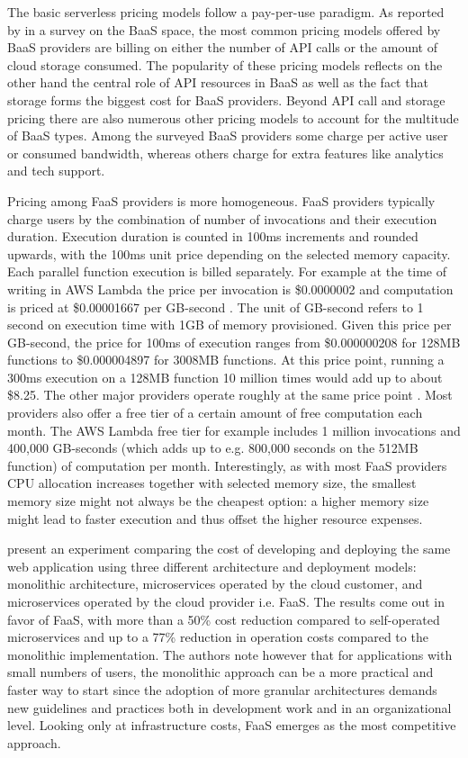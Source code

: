 The basic serverless pricing models follow a pay-per-use paradigm. As reported by \textcite{lane13baas} in a survey on the BaaS space, the most common pricing models offered by BaaS providers are billing on either the number of API calls or the amount of cloud storage consumed. The popularity of these pricing models reflects on the other hand the central role of API resources in BaaS as well as the fact that storage forms the biggest cost for BaaS providers. Beyond API call and storage pricing there are also numerous other pricing models to account for the multitude of BaaS types. Among the surveyed BaaS providers some charge per active user or consumed bandwidth, whereas others charge for extra features like analytics and tech support.

Pricing among FaaS providers is more homogeneous. FaaS providers typically charge users by the combination of number of invocations and their execution duration. Execution duration is counted in 100ms increments and rounded upwards, with the 100ms unit price depending on the selected memory capacity. Each parallel function execution is billed separately. For example at the time of writing in AWS Lambda the price per invocation is \$0.0000002 and computation is priced at \$0.00001667 per GB-second \parencite{awslambda0218}. The unit of GB-second refers to 1 second on execution time with 1GB of memory provisioned. Given this price per GB-second, the price for 100ms of execution ranges from \$0.000000208 for 128MB functions to \$0.000004897 for 3008MB functions. At this price point, running a 300ms execution on a 128MB function 10 million times would add up to about \$8.25. The other major providers operate roughly at the same price point \parencite{microsoft18azureFunctions,ibm18cloudFunctions,google18cloudFunctions}. Most providers also offer a free tier of a certain amount of free computation each month. The AWS Lambda free tier for example includes 1 million invocations and 400,000 GB-seconds (which adds up to e.g. 800,000 seconds on the 512MB function) of computation per month. Interestingly, as with most FaaS providers CPU allocation increases together with selected memory size, the smallest memory size might not always be the cheapest option: a higher memory size might lead to faster execution and thus offset the higher resource expenses.

\textcite{villamizar2017cost} present an experiment comparing the cost of developing and deploying the same web application using three different architecture and deployment models: monolithic architecture, microservices operated by the cloud customer, and microservices operated by the cloud provider i.e. FaaS. The results come out in favor of FaaS, with more than a 50\% cost reduction compared to self-operated microservices and up to a 77\% reduction in operation costs compared to the monolithic implementation. The authors note however that for applications with small numbers of users, the monolithic approach can be a more practical and faster way to start since the adoption of more granular architectures demands new guidelines and practices both in development work and in an organizational level. Looking only at infrastructure costs, FaaS emerges as the most competitive approach.

